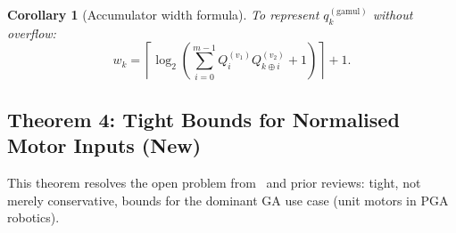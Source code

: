 \documentclass[11pt,a4paper]{article}
\theoremstyle{definition}
\theoremstyle{plain}
\newtheorem{corollary}{Corollary}[section]
\theoremstyle{remark}
\begin{document}
\begin{corollary}[Accumulator width formula]
\label{cor:accum}
To represent $q_k^{(\mathrm{gamul})}$ without overflow:
\begin{equation}\label{eq:accum-width}
  w_k=\left\lceil\log_2\!\left(
    \sum_{i=0}^{m-1}Q_i^{(v_1)}Q_{k\oplus i}^{(v_2)}+1\right)\right\rceil+1.
\end{equation}
\end{corollary}

\subsection{Theorem 4: Tight Bounds for Normalised Motor Inputs (New)}
\label{sec:constrained}

This theorem resolves the open problem from~\cite{dang2025sketch} and prior
reviews: tight, not merely conservative, bounds for the dominant GA
use case (unit motors in PGA robotics).
\end{document}
